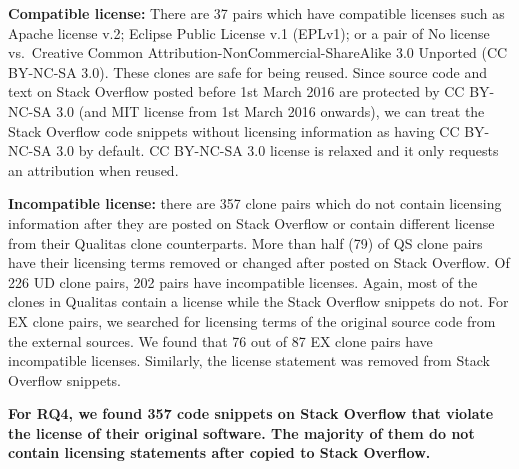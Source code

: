 \documentclass[sigconf,review, anonymous]{acmart}
\begin{document}
\textbf{Compatible license:} There are 37 pairs which have compatible licenses such as Apache license v.2; Eclipse Public License v.1 (EPLv1); or a pair of No license vs.~Creative Common Attribution-NonCommercial-ShareAlike 3.0 Unported (CC BY-NC-SA 3.0). These clones are safe for being reused. Since source code and text on Stack Overflow posted before 1st March 2016 are protected by CC BY-NC-SA 3.0 (and MIT license from 1st March 2016 onwards), we can treat the Stack Overflow code snippets without licensing information as having CC BY-NC-SA 3.0 by default. CC BY-NC-SA 3.0 license is relaxed and it only requests an attribution when reused. 

\textbf{Incompatible license:} there are 357 clone pairs which do not contain licensing information after they are posted on Stack Overflow or contain different license from their Qualitas clone counterparts. More than half (79) of QS clone pairs have their licensing terms removed or changed after posted on Stack Overflow. Of 226 UD clone pairs, 202 pairs have incompatible licenses. Again, most of the clones in Qualitas contain a license while the Stack Overflow snippets do not. For EX clone pairs, we searched for licensing terms of the original source code from the external sources. We found that 76 out of 87 EX clone pairs have incompatible licenses. %
Similarly, the license statement was removed from Stack Overflow snippets. 
%

\textbf{For RQ4, we found 357 code snippets on Stack Overflow that violate the license of their original software. The majority of them do not contain licensing statements after copied to Stack Overflow.}
\end{document}
